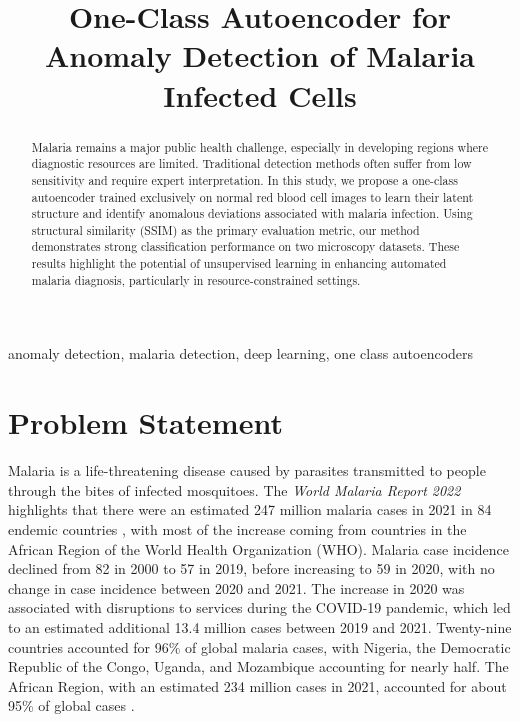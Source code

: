 \documentclass[journal,12pt,onecolumn,draftcls]{IEEEtran}
\begin{document}
\title{One-Class Autoencoder for Anomaly Detection of Malaria Infected Cells}
\author{}
\maketitle
\begin{abstract}
  Malaria remains a major public health challenge, especially in developing regions where diagnostic resources are limited. Traditional detection methods often suffer from low sensitivity and require expert interpretation. In this study, we propose a one-class autoencoder trained exclusively on normal red blood cell images to learn their latent structure and identify anomalous deviations associated with malaria infection. Using structural similarity (SSIM) as the primary evaluation metric, our method demonstrates strong classification performance on two microscopy datasets. These results highlight the potential of unsupervised learning in enhancing automated malaria diagnosis, particularly in resource-constrained settings.
\end{abstract}

\begin{IEEEkeywords}
anomaly detection, malaria detection, deep learning, one class autoencoders
\end{IEEEkeywords}

\section{Problem Statement}
Malaria is a life-threatening disease caused by parasites transmitted to people through the bites of infected mosquitoes. The \textit{World Malaria Report 2022} highlights that there were an estimated 247 million malaria cases in 2021 in 84 endemic countries \cite{who2022}, with most of the increase coming from countries in the African Region of the World Health Organization (WHO). Malaria case incidence declined from 82 in 2000 to 57 in 2019, before increasing to 59 in 2020, with no change in case incidence between 2020 and 2021. The increase in 2020 was associated with disruptions to services during the COVID-19 pandemic, which led to an estimated additional 13.4 million cases between 2019 and 2021. Twenty-nine countries accounted for 96\% of global malaria cases, with Nigeria, the Democratic Republic of the Congo, Uganda, and Mozambique accounting for nearly half. The African Region, with an estimated 234 million cases in 2021, accounted for about 95\% of global cases \cite{who2022}.
\end{document}
